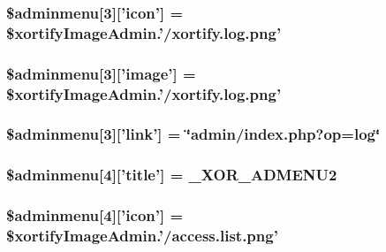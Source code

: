 \hypertarget{menu_8php_a967967c3b047a56a25c5e7fb4979a0de}{
\subsubsection[{\$adminmenu}]{\setlength{\rightskip}{0pt plus 5cm}\$adminmenu\mbox{[}3\mbox{]}\mbox{[}'icon'\mbox{]} = \$xortify\-Image\-Admin.'/xortify.\-log.\-png'}}\label{menu_8php_a967967c3b047a56a25c5e7fb4979a0de}
\hypertarget{menu_8php_a611f5939c752bb454bdce8f81812e872}{
\subsubsection[{\$adminmenu}]{\setlength{\rightskip}{0pt plus 5cm}\$adminmenu\mbox{[}3\mbox{]}\mbox{[}'image'\mbox{]} = \$xortify\-Image\-Admin.'/xortify.\-log.\-png'}}\label{menu_8php_a611f5939c752bb454bdce8f81812e872}
\hypertarget{menu_8php_ac8c8ccf89ea2c8889dd64b08737d6dd9}{
\subsubsection[{\$adminmenu}]{\setlength{\rightskip}{0pt plus 5cm}\$adminmenu\mbox{[}3\mbox{]}\mbox{[}'link'\mbox{]} = \char`\"{}admin/index.\-php?op=log\char`\"{}}}\label{menu_8php_ac8c8ccf89ea2c8889dd64b08737d6dd9}
\hypertarget{menu_8php_ac3c70c66723d68528e5e9c8a4383c126}{
\subsubsection[{\$adminmenu}]{\setlength{\rightskip}{0pt plus 5cm}\$adminmenu\mbox{[}4\mbox{]}\mbox{[}'title'\mbox{]} = {\bf \-\_\-\-X\-O\-R\-\_\-\-A\-D\-M\-E\-N\-U2}}}\label{menu_8php_ac3c70c66723d68528e5e9c8a4383c126}
\hypertarget{menu_8php_ae825aefb069414ecc0bbf1fc86335167}{
\subsubsection[{\$adminmenu}]{\setlength{\rightskip}{0pt plus 5cm}\$adminmenu\mbox{[}4\mbox{]}\mbox{[}'icon'\mbox{]} = \$xortify\-Image\-Admin.'/access.\-list.\-png'}}\label{menu_8php_ae825aefb069414ecc0bbf1fc86335167}
